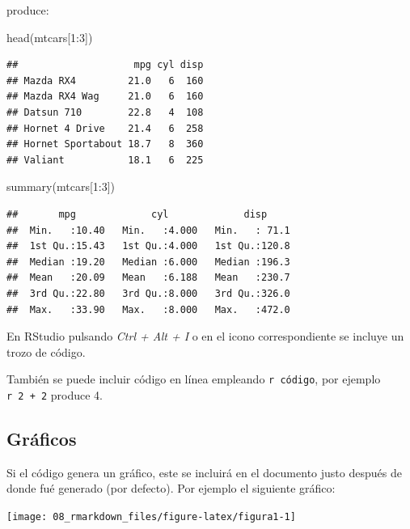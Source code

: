 \documentclass[
]{book}
\newenvironment{Shaded}{\begin{snugshade}}{\end{snugshade}}
\newcommand{\DecValTok}[1]{\textcolor[rgb]{0.00,0.00,0.81}{#1}}
\newcommand{\FunctionTok}[1]{\textcolor[rgb]{0.00,0.00,0.00}{#1}}
\newcommand{\NormalTok}[1]{#1}
\newcommand{\SpecialCharTok}[1]{\textcolor[rgb]{0.00,0.00,0.00}{#1}}
\theoremstyle{break}
\theoremstyle{nonumberplain}
\begin{document}
produce:

\begin{Shaded}
\begin{Highlighting}[]
\FunctionTok{head}\NormalTok{(mtcars[}\DecValTok{1}\SpecialCharTok{:}\DecValTok{3}\NormalTok{])}
\end{Highlighting}
\end{Shaded}

\begin{verbatim}
##                    mpg cyl disp
## Mazda RX4         21.0   6  160
## Mazda RX4 Wag     21.0   6  160
## Datsun 710        22.8   4  108
## Hornet 4 Drive    21.4   6  258
## Hornet Sportabout 18.7   8  360
## Valiant           18.1   6  225
\end{verbatim}

\begin{Shaded}
\begin{Highlighting}[]
\FunctionTok{summary}\NormalTok{(mtcars[}\DecValTok{1}\SpecialCharTok{:}\DecValTok{3}\NormalTok{])}
\end{Highlighting}
\end{Shaded}

\begin{verbatim}
##       mpg             cyl             disp      
##  Min.   :10.40   Min.   :4.000   Min.   : 71.1  
##  1st Qu.:15.43   1st Qu.:4.000   1st Qu.:120.8  
##  Median :19.20   Median :6.000   Median :196.3  
##  Mean   :20.09   Mean   :6.188   Mean   :230.7  
##  3rd Qu.:22.80   3rd Qu.:8.000   3rd Qu.:326.0  
##  Max.   :33.90   Max.   :8.000   Max.   :472.0
\end{verbatim}

En RStudio pulsando \emph{Ctrl + Alt + I} o en el icono correspondiente se incluye un trozo de código.

También se puede incluir código en línea empleando \texttt{\textasciigrave{}r\ código\textasciigrave{}},
por ejemplo \texttt{\textasciigrave{}r\ 2\ +\ 2\textasciigrave{}} produce 4.

\hypertarget{gruxe1ficos}{%
\subsection{Gráficos}\label{gruxe1ficos}}

Si el código genera un gráfico, este se incluirá en el documento justo después de donde fué generado
(por defecto). Por ejemplo el siguiente gráfico:

\begin{center}\texttt{[image: 08\_rmarkdown\_files/figure-latex/figura1-1]} \end{center}
\end{document}
